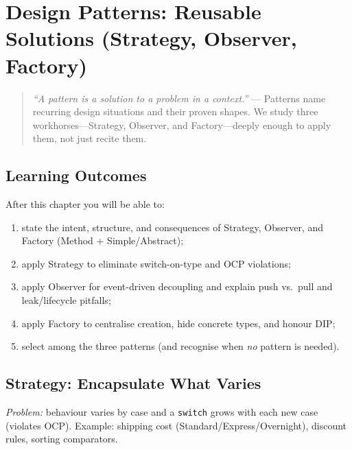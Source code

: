 \chapter{Design Patterns: Reusable Solutions (Strategy, Observer, Factory)}
\label{ch:patterns}

\begin{quote}
\emph{``A pattern is a solution to a problem in a context.''} --- Patterns name recurring design situations and their proven shapes. We study three workhorses---Strategy, Observer, and Factory---deeply enough to apply them, not just recite them.
\end{quote}

\noindent{}
\vspace{0.4em}

\section*{Learning Outcomes}
After this chapter you will be able to:
\begin{enumerate}[label=(L\arabic*)]
    \item state the intent, structure, and consequences of Strategy, Observer, and Factory (Method + Simple/Abstract);
    \item apply Strategy to eliminate switch-on-type and OCP violations;
    \item apply Observer for event-driven decoupling and explain push vs.\ pull and leak/lifecycle pitfalls;
    \item apply Factory to centralise creation, hide concrete types, and honour DIP;
    \item select among the three patterns (and recognise when \emph{no} pattern is needed).
\end{enumerate}

\section{Strategy: Encapsulate What Varies}
\label{sec:strategy}
\emph{Problem:} behaviour varies by case and a \texttt{switch} grows with each new case (violates OCP). Example: shipping cost (Standard/Express/Overnight), discount rules, sorting comparators.

